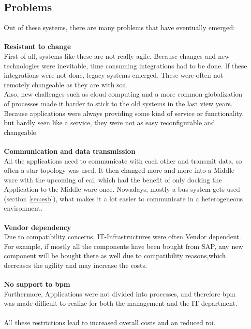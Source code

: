 \documentclass[12pt]{article}
\begin{document}
\newpage
\subsection{Problems}
Out of these systems, there are many problems that have eventually emerged:
\\ \\\textbf{Resistant to change}\\
First of all, systems like these are not really agile. Because changes and new technologies were inevitable, time consuming integrations had to be done. If these integrations were not done, legacy systems emerged. These were often not remotely changeable as they are with \gls{soa}. \\
Also, new challenges such as cloud computing and a more common globalization of processes made it harder to stick to the old systems in the last view years. \\
Because applications were always providing some kind of service or functionality, but hardly seen like a service, they were not as easy reconfigurable and changeable. 
\\ \\\textbf{Communication and data transmission}\\
All the applications need to communicate with each other and transmit data, so often a star topology was used. It then changed more and more into a Middle-ware with the upcoming of \gls{eai}, which had the benefit of only docking the Application to the Middle-ware once. Nowadays, mostly a bus system gets used (section \ref{sec:esb}), what makes it a lot easier to communicate in a heterogeneous environment. 
\\ \\\textbf{Vendor dependency}\\
Due to compatibility concerns, IT-Infrastructures were often Vendor dependent. For example, if mostly all the components have been bought from SAP, any new component will be bought there as well due to compatibility reasons,which decreases the agility and may increase the costs.
\\ \\\textbf{No support to \gls{bpm}}\\
Furthermore, Applications were not divided into processes, and therefore \gls{bpm} was made difficult to realize for both the management and the IT-department. \\ \\
All these restrictions lead to increased overall costs and an reduced \gls{roi}.
\end{document}
